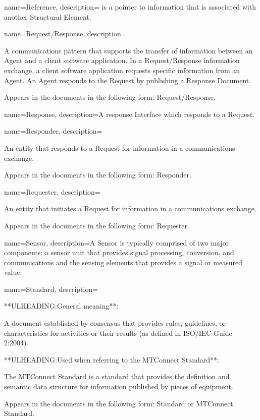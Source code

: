 {
    name={Reference},
	description={ is a pointer to information that is associated with another \gls{Structural Element}.}
}

{
    name={Request/Response},
	description={
	A communications pattern that supports the transfer of information between an \gls{Agent} and a client software application. In a \gls{Request/Response} information exchange, a client software application requests specific information from an \gls{Agent}. An \gls{Agent} responds to the \gls{Request} by publishing a \gls{Response Document}.   

	Appears in the documents in the following form: \gls{Request/Response}.
}
}

{
    name={Response},
	description={A response \gls{Interface} which responds to a \gls{Request}.}
}

{
    name={Responder},
	description={
	An entity that responds to a \gls{Request} for information in a communications exchange.

	Appears in the documents in the following form: \gls{Responder}.
}
}

{
    name={Requester},
	description={
	An entity that initiates a \gls{Request} for information in a communications exchange.

	Appears in the documents in the following form: \gls{Requester}.
}
}

{
    name={Sensor},
	description={A \gls{Sensor} is typically comprised of two major components: a \gls{sensor unit} that provides signal processing, conversion, and communications and the \gls{sensing elements} that provides a signal or measured value.}
}

{
    name={Standard},
	description={
	**ULHEADING:General meaning**:

	A document established by consensus that provides rules, guidelines, or characteristics for activities or their results (as defined in ISO/IEC Guide 2:2004).

	**ULHEADING:Used when referring to the MTConnect Standard**: 

	The MTConnect Standard is a standard that provides the definition and semantic data structure for information published by pieces of equipment.

	Appears in the documents in the following form: Standard or MTConnect Standard.
}
}

